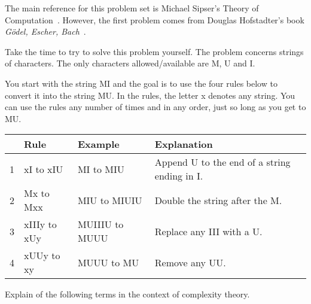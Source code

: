 \documentclass[a4paper, 12pt]{exam}
\begin{document}
\noindent
The main reference for this problem set is Michael Sipser's Theory of Computation~\cite{sipserbook}.
However, the first problem comes from Douglas Hofstadter's book \emph{Gödel, Escher, Bach}~\cite{hofstadter79}.

\begin{questions}


\question
  Take the time to try to solve this problem yourself.
  The problem concerns strings of characters.
  The only characters allowed/available are M, U and I.

  You start with the string MI and the goal is to use the four rules below to convert it into the string MU.
  In the rules, the letter x denotes any string.
  You can use the rules any number of times and in any order, just so long as you get to MU.

  \begin{center}
  \begin{tabular}{rlll}

  & Rule & Example & Explanation  \\
  \midrule
  1 &	xI to xIU & MI	to	MIU & Append U to the end of a string ending in I. \\
  2 &	Mx to Mxx & MIU	to	MIUIU & Double the string after the M. \\
  3 &	xIIIy to xUy & MUIIIU	to	MUUU & Replace any III with a U. \\
  4 &	xUUy to xy & MUUU	to	MU & Remove any UU. \\
  \bottomrule
  \end{tabular}
  \end{center}


\question
  Explain of the following terms in the context of complexity theory.
\end{questions}
\end{document}
